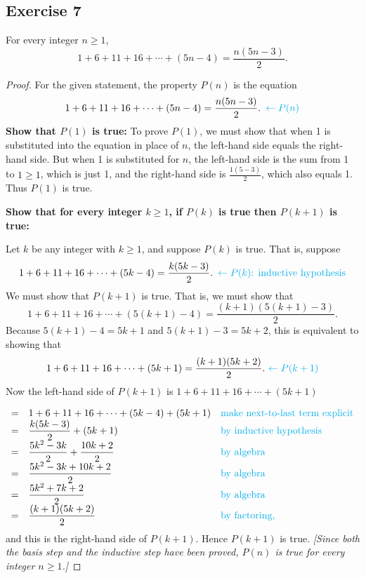 \documentclass[14pt]{extarticle}
\newcommand{\dps}{\displaystyle}
\newcommand{\from}{\leftarrow}
\newcommand{\cy}{\color{cyan}}
\begin{document}
\subsection{Exercise 7}
For every integer $n \geq 1$,
\[
1 + 6 + 11 + 16 + \cdots + (5n-4) = \frac{n(5n-3)}{2}.
\]
\begin{proof}
For the given statement, the property $P(n)$ is the equation
\[
1 + 6 + 11 + 16 + \cdots + (5n-4) = \frac{n(5n-3)}{2}. \,\,\, {\cy \from P(n)}
\]
{\bf Show that $P(1)$ is true:} To prove $P(1)$, we must show that when 1 is substituted into the equation in place of $n$, the left-hand side equals the right-hand side. But when 1 is substituted for $n$, the left-hand side is the sum from 1 to $1 \geq 1$, which is just 1, and the right-hand side is $\frac{1(5-3)}{2}$, which also equals 1. Thus $P(1)$ is true.

{\bf Show that for every integer $k \geq 1$, if $P(k)$ is true then $P(k + 1)$ is true:}

Let $k$ be any integer with $k \geq 1$, and suppose $P(k)$ is true. That is, suppose
\[
1 + 6 + 11 + 16 + \cdots + (5k-4) = \frac{k(5k-3)}{2}. \,\,\, {\cy \from P(k) \text{: inductive hypothesis}}
\]
We must show that $P(k + 1)$ is true. That is, we must show that
\[
1 + 6 + 11 + 16 + \cdots + (5(k+1)-4) = \frac{(k+1)(5(k+1)-3)}{2}.
\]
Because $5(k + 1) - 4 = 5k+1$ and $5(k + 1) - 3 = 5k+2$, this is equivalent to showing that
\[
1 + 6 + 11 + 16 + \cdots + (5k+1) = \frac{(k+1)(5k+2)}{2}. \,\, {\cy \from P(k + 1)}
\]
Now the left-hand side of $P(k + 1)$ is $1 + 6 + 11 + 16 + \cdots + (5k+1)$

\[
\begin{array}{lll}
= & \dps 1 + 6 + 11 + 16 + \cdots + (5k-4) + (5k+1)  & \text{\cy make next-to-last term explicit} \\
= & \dps \frac{k(5k-3)}{2} + (5k+1) & \text{\cy by inductive hypothesis} \\
= & \dps \frac{5k^2-3k}{2} + \frac{10k+2}{2} & \text{\cy by algebra} \\
= & \dps \frac{5k^2-3k + 10k + 2}{2} & \text{\cy by algebra} \\
= & \dps \frac{5k^2 + 7k + 2}{2} & \text{\cy by algebra} \\
= & \dps \frac{(k+1)(5k+2)}{2} & \text{\cy by factoring,}
\end{array}
\]
and this is the right-hand side of $P(k + 1)$. Hence $P(k + 1)$ is true. {\it [Since both the basis step and the inductive step have been proved, $P(n)$ is true for every integer $n \geq 1$.]}
\end{proof}
\end{document}
